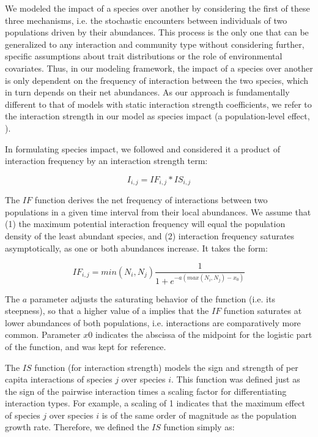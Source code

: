 We modeled the impact of a species over another by considering the first of these three mechanisms, i.e. the stochastic encounters between individuals of two populations driven by their abundances. This process is the only one that can be generalized to any interaction and community type without considering further, specific assumptions about trait distributions or the role of environmental covariates. Thus, in our modeling framework, the impact of a species over another is only dependent on the frequency of interaction between the two species, which in turn depends on their net abundances. As our approach is fundamentally different to that of models with static interaction strength coefficients, we refer to the interaction strength in our model as species impact (a population-level effect, \citealt{Vazquez2012}).

In formulating species impact, we followed \cite{Poisot2015} and considered it a product of interaction frequency by an interaction strength term:

\begin{equation} \label{eq:eq3.1}
I_{i,j} = IF_{i,j} * IS_{i,j}
\end{equation}

The $IF$ function derives the net frequency of interactions between two populations in a given time interval from their local abundances. We assume that (1) the maximum potential interaction frequency will equal the population density of the least abundant species, and (2) interaction frequency saturates asymptotically, as one or both abundances increase. It takes the form:

\begin{equation} \label{eq:eq3.2}
IF_{i,j} = min(N_i,N_j) \frac{1}{1 + e^{-a(max(N_{i},N_{j}) - x_0)}}
\end{equation}

The $a$ parameter adjusts the saturating behavior of the function (i.e. its steepness), so that a higher value of a implies that the $IF$ function saturates at lower abundances of both populations, i.e. interactions are comparatively more common. Parameter $x0$ indicates the abscissa of the midpoint for the logistic part of the function, and was kept for reference.

The $IS$ function (for interaction strength) models the sign and strength of per capita interactions of species $j$ over species $i$. This function was defined just as the sign of the pairwise interaction times a scaling factor for differentiating interaction types. For example, a scaling of 1 indicates that the maximum effect of species $j$ over species $i$ is of the same order of magnitude as the population growth rate. Therefore, we defined the $IS$ function simply as:

